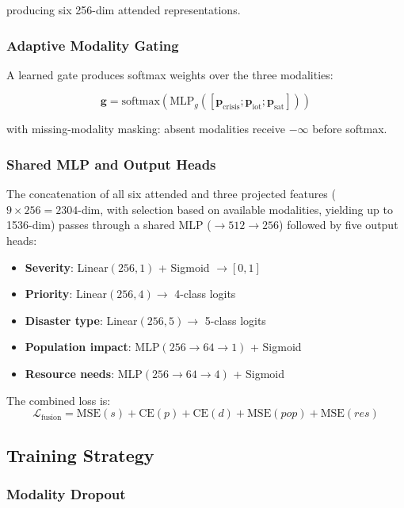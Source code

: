 \documentclass[journal]{IEEEtran}
\begin{document}
producing six 256-dim attended representations.

\subsubsection{Adaptive Modality Gating}

A learned gate produces softmax weights over the three modalities:

\begin{equation}
\mathbf{g} = \text{softmax}(\text{MLP}_g([\mathbf{p}_\text{crisis}; \mathbf{p}_\text{iot}; \mathbf{p}_\text{sat}]))
\end{equation}

with missing-modality masking: absent modalities receive $-\infty$ before softmax.

\subsubsection{Shared MLP and Output Heads}

The concatenation of all six attended and three projected features ($9 \times 256 = 2304$-dim, with selection based on available modalities, yielding up to 1536-dim) passes through a shared MLP ($\to 512 \to 256$) followed by five output heads:

\begin{itemize}
    \item \textbf{Severity}: Linear$(256,1)$ + Sigmoid $\to [0,1]$
    \item \textbf{Priority}: Linear$(256,4) \to$ 4-class logits
    \item \textbf{Disaster type}: Linear$(256,5) \to$ 5-class logits
    \item \textbf{Population impact}: MLP$(256 \to 64 \to 1)$ + Sigmoid
    \item \textbf{Resource needs}: MLP$(256 \to 64 \to 4)$ + Sigmoid
\end{itemize}

The combined loss is:
\begin{equation}
\mathcal{L}_\text{fusion} = \text{MSE}(s) + \text{CE}(p) + \text{CE}(d) + \text{MSE}(pop) + \text{MSE}(res)
\end{equation}

\subsection{Training Strategy}

\subsubsection{Modality Dropout}
\end{document}
